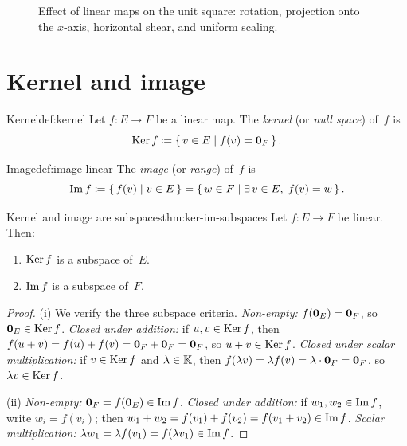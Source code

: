 \begin{figure}[ht]
\caption{Effect of linear maps on the unit square: rotation, projection
  onto the $x$-axis, horizontal shear, and uniform scaling.}
\label{fig:linear-map-effects}
\end{figure}


\section{Kernel and image}\label{sec:kernel-image}

\begin{definition}{Kernel}{def:kernel}
Let $f\colon E\to F$ be a linear map. The \emph{kernel} (or
\emph{null space}) of~$f$ is
\[
  \operatorname{Ker} f \coloneqq \left\{\,v\in E\;\middle|\;f(v) = \mathbf{0}_F\,\right\}.
\]
\end{definition}

\begin{definition}{Image}{def:image-linear}
The \emph{image} (or \emph{range}) of~$f$ is
\[
  \operatorname{Im} f \coloneqq \left\{\,f(v)\;\middle|\;v\in E\,\right\}
  = \left\{\,w\in F\;\middle|\;\exists\, v\in E,\; f(v) = w\,\right\}.
\]
\end{definition}

\begin{theorem}{Kernel and image are subspaces}{thm:ker-im-subspaces}
Let $f\colon E\to F$ be linear. Then:
\begin{enumerate}[label=(\roman*)]
  \item $\operatorname{Ker} f$ is a subspace of~$E$.
  \item $\operatorname{Im} f$ is a subspace of~$F$.
\end{enumerate}
\end{theorem}

\begin{proof}
(i) We verify the three subspace criteria.
\emph{Non-empty:} $f(\mathbf{0}_E) = \mathbf{0}_F$, so
$\mathbf{0}_E\in\operatorname{Ker} f$.
\emph{Closed under addition:} if $u,v\in\operatorname{Ker} f$, then
$f(u+v) = f(u)+f(v) = \mathbf{0}_F+\mathbf{0}_F = \mathbf{0}_F$, so $u+v\in\operatorname{Ker} f$.
\emph{Closed under scalar multiplication:} if $v\in\operatorname{Ker} f$ and
$\lambda\in{\mathbb{K}}$, then
$f(\lambda v) = \lambda f(v) = \lambda\cdot\mathbf{0}_F = \mathbf{0}_F$,
so $\lambda v\in\operatorname{Ker} f$.

(ii) \emph{Non-empty:} $\mathbf{0}_F = f(\mathbf{0}_E)\in\operatorname{Im} f$.
\emph{Closed under addition:} if $w_1,w_2\in\operatorname{Im} f$, write
$w_i = f(v_i)$; then $w_1+w_2 = f(v_1)+f(v_2) = f(v_1+v_2)\in\operatorname{Im} f$.
\emph{Scalar multiplication:}
$\lambda w_1 = \lambda f(v_1) = f(\lambda v_1)\in\operatorname{Im} f$.
\end{proof}

